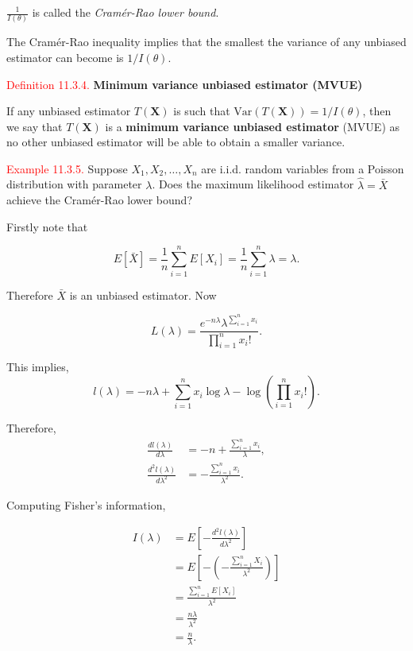 \documentclass[
]{book}
\begin{document}
\(\frac{1}{I(\theta)}\) is called the \emph{Cramér-Rao lower bound}.

The Cramér-Rao inequality implies that the smallest the variance of any unbiased estimator can become is \(1/I(\theta)\).

\leavevmode{}%
\textcolor{red}{Definition 11.3.4.}
{\textbf{Minimum variance unbiased estimator (MVUE)}}

If any unbiased estimator \(T(\mathbf{X})\) is such that \(\text{Var}(T(\mathbf{X}))=1/I(\theta)\), then we say that \(T(\mathbf{X})\) is a \textbf{minimum variance unbiased estimator} (MVUE) as no other unbiased estimator will be able to obtain a smaller variance.

\leavevmode{}%
\textcolor{red}{Example 11.3.5.}
Suppose \(X_1,X_2,\dots,X_n\) are i.i.d. random variables from a Poisson distribution with parameter \(\lambda\). Does the maximum likelihood estimator \(\hat{\lambda} = \bar{X}\) achieve the Cramér-Rao lower bound?

Firstly note that

\[E[\bar{X}] = \frac{1}{n} \sum\limits_{i=1}^n E[X_i] = \frac{1}{n} \sum\limits_{i=1}^n \lambda = \lambda.\]

Therefore \(\bar{X}\) is an unbiased estimator. Now

\[ L(\lambda) = \frac{ e^{-n\lambda} \lambda^{\sum\limits_{i=1}^n x_i} }{ \prod\limits_{i=1}^n x_i!}.\]

This implies,\\

\[ l(\lambda)  = -n\lambda + \sum\limits_{i=1}^n x_i \log \lambda - \log \left( \prod\limits_{i=1}^n x_i! \right).\]

Therefore,\\

\begin{align*}
\frac{dl(\lambda)}{d\lambda} &= -n + \frac{\sum_{i=1}^n x_i}{\lambda}, \\[3pt]
\frac{d^2 l(\lambda)}{d\lambda^2} &= - \frac{\sum_{i=1}^n x_i}{\lambda^2}.
\end{align*}

Computing Fisher's information,

\begin{align*}
I(\lambda) &= E \left[ -\frac{d^2 l(\lambda)}{d\lambda^2} \right] \\%
&= E \left[ - \left( - \frac{\sum_{i=1}^n X_i}{\lambda^2} \right) \right] \\%
&= \frac{ \sum\limits_{i=1}^n E[X_i] }{\lambda^2} \\%
&= \frac{n\lambda}{\lambda^2} \\%
&= \frac{n}{\lambda}.
\end{align*}
\end{document}
